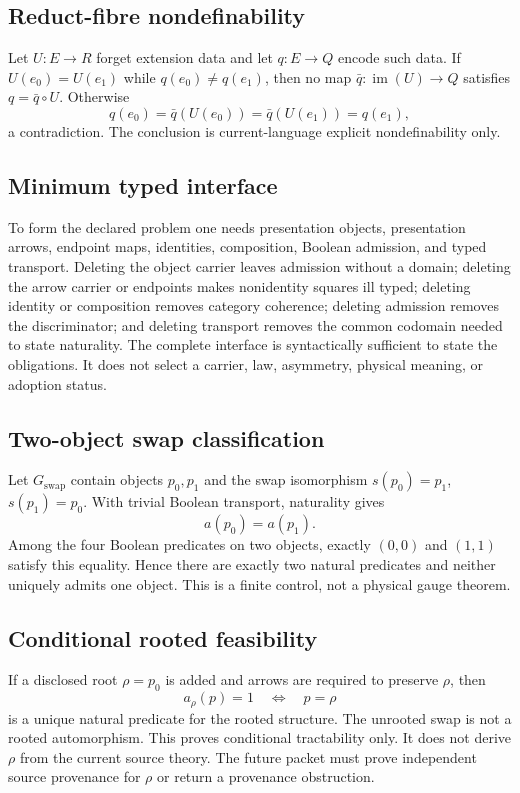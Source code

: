 \documentclass[11pt]{article}
\begin{document}
\subsection{Reduct-fibre nondefinability}

Let $U:E\to R$ forget extension data and let $q:E\to Q$ encode such data.  If
$U(e_0)=U(e_1)$ while $q(e_0)\ne q(e_1)$, then no map
$\bar q:\operatorname{im}(U)\to Q$ satisfies $q=\bar q\circ U$.  Otherwise
\[
 q(e_0)=\bar q(U(e_0))=\bar q(U(e_1))=q(e_1),
\]
a contradiction.  The conclusion is current-language explicit
nondefinability only.

\subsection{Minimum typed interface}

To form the declared problem one needs presentation objects, presentation
arrows, endpoint maps, identities, composition, Boolean admission, and typed
transport.  Deleting the object carrier leaves admission without a domain;
deleting the arrow carrier or endpoints makes nonidentity squares ill typed;
deleting identity or composition removes category coherence; deleting
admission removes the discriminator; and deleting transport removes the common
codomain needed to state naturality.  The complete interface is syntactically
sufficient to state the obligations.  It does not select a carrier, law,
asymmetry, physical meaning, or adoption status.

\subsection{Two-object swap classification}

Let $G_{\mathrm{swap}}$ contain objects $p_0,p_1$ and the swap isomorphism
$s(p_0)=p_1$, $s(p_1)=p_0$.  With trivial Boolean transport, naturality gives
\[
 a(p_0)=a(p_1).
\]
Among the four Boolean predicates on two objects, exactly
$(0,0)$ and $(1,1)$ satisfy this equality.  Hence there are exactly two natural
predicates and neither uniquely admits one object.  This is a finite control,
not a physical gauge theorem.

\subsection{Conditional rooted feasibility}

If a disclosed root $\rho=p_0$ is added and arrows are required to preserve
$\rho$, then
\[
 a_{\rho}(p)=1 \quad\Longleftrightarrow\quad p=\rho
\]
is a unique natural predicate for the rooted structure.  The unrooted swap is
not a rooted automorphism.  This proves conditional tractability only.  It does
not derive $\rho$ from the current source theory.  The future packet must prove
independent source provenance for $\rho$ or return a provenance obstruction.
\end{document}
